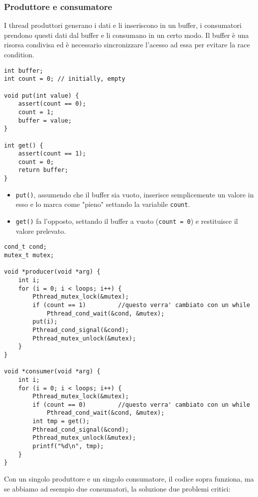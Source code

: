 \documentclass[12pt, twoside, letterpaper]{article}
\begin{document}
			\subsubsection{Produttore e consumatore}
				I thread produttori generano i dati e li inseriscono in un buffer, i consumatori prendono questi dati dal buffer e li consumano in un certo modo. Il buffer è una risorsa condivisa ed è necessario sincronizzare l'acesso ad essa per evitare la race condition.
				\begin{lstlisting}[style=CStyle]
int buffer;
int count = 0; // initially, empty

void put(int value) {
	assert(count == 0);
	count = 1;
	buffer = value;
}

int get() {
	assert(count == 1);
	count = 0;
	return buffer;
}				\end{lstlisting}
				\begin{itemize}
				\item \texttt{put()}, assumendo che il buffer sia vuoto, inserisce semplicemente un valore in esso e lo marca come "pieno" settando la variabile \texttt{count}. 
				\item \texttt{get()} fa l'opposto, settando il buffer a vuoto (\texttt{count = 0}) e restituisce il valore prelevato.
				\end{itemize}
				\begin{lstlisting}[style=CStyle]
cond_t cond;
mutex_t mutex;

void *producer(void *arg) {
	int i;
	for (i = 0; i < loops; i++) {
		Pthread_mutex_lock(&mutex);
		if (count == 1)			//questo verra' cambiato con un while
			Pthread_cond_wait(&cond, &mutex);
		put(i);
		Pthread_cond_signal(&cond);
		Pthread_mutex_unlock(&mutex);
	}
}

void *consumer(void *arg) {
	int i;
	for (i = 0; i < loops; i++) {
		Pthread_mutex_lock(&mutex);
		if (count == 0)			//questo verra' cambiato con un while
			Pthread_cond_wait(&cond, &mutex);
		int tmp = get();
		Pthread_cond_signal(&cond);
		Pthread_mutex_unlock(&mutex);
		printf("%d\n", tmp);
	}
}				\end{lstlisting}
				Con un singolo produttore e un singolo consumatore, il codice sopra funziona, ma se abbiamo ad esempio due consumatori, la soluzione due problemi critici:
\end{document}
